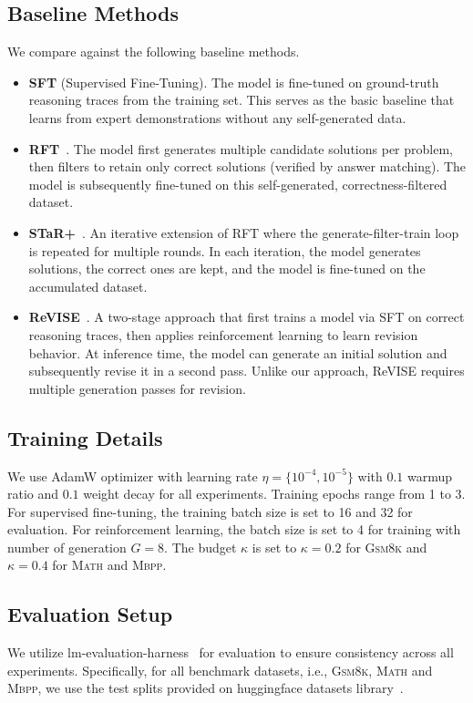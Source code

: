 \subsection{Baseline Methods}
We compare \modelname against the following baseline methods.
\begin{itemize}[noitemsep, topsep=-1pt, leftmargin=*]
    \item \textbf{SFT} (Supervised Fine-Tuning). The model is fine-tuned on ground-truth reasoning traces from the training set. This serves as the basic baseline that learns from expert demonstrations without any self-generated data.
    \item \textbf{RFT}~\citep{yuan2023scaling}. The model first generates multiple candidate solutions per problem, then filters to retain only correct solutions (verified by answer matching). The model is subsequently fine-tuned on this self-generated, correctness-filtered dataset. 
    \item \textbf{STaR+}~\citep{zelikman2022star}. An iterative extension of RFT where the generate-filter-train loop is repeated for multiple rounds. In each iteration, the model generates solutions, the correct ones are kept, and the model is fine-tuned on the accumulated dataset.
    \item \textbf{ReVISE}~\citep{lee2025revise}. A two-stage approach that first trains a model via SFT on correct reasoning traces, then applies reinforcement learning to learn revision behavior. At inference time, the model can generate an initial solution and subsequently revise it in a second pass. Unlike our approach, ReVISE requires multiple generation passes for revision.
\end{itemize}

\subsection{Training Details}
We use AdamW optimizer with learning rate $\eta = \{10^{-4}, 10^{-5}\}$ with $0.1$ warmup ratio and $0.1$ weight decay for all experiments.
Training epochs range from 1 to 3.
For supervised fine-tuning, the training batch size is set to 16 and 32 for evaluation.
For reinforcement learning, the batch size is set to 4 for training with number of generation $G=8$.
The \bk budget $\kappa$ is set to $\kappa=0.2$ for \textsc{Gsm8k} and $\kappa=0.4$ for \textsc{Math} and \textsc{Mbpp}.
\subsection{Evaluation Setup}
We utilize lm-evaluation-harness~\cite{eval-harness} for evaluation to ensure consistency across all experiments. 
Specifically, for all benchmark datasets, i.e., \textsc{Gsm8k}, \textsc{Math} and \textsc{Mbpp}, we use the test splits provided on huggingface datasets library~\cite{lhoest2021datasets}.



